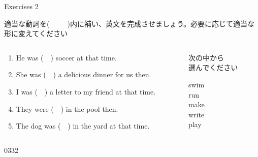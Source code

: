 \documentclass[aspectratio=169,xcolor={dvipsnames,table}]{beamer}
\begin{document}
\begin{frame}[plain]{Exercises 2}

{\small 適当な動詞を(~~~~~)内に補い、英文を完成させましょう。必要に応じて適当な形に変えてください}

\begin{columns}[t]
\begin{column}{.75\textwidth}
 \begin{enumerate}
  \item He was (~~) soccer at that time.
  \item She was  (~~) a delicious dinner for us then.
  \item I was  (~~) a letter to my friend at that time.
  \item They were  (~~) in the pool then.
  \item The dog was  (~~) in the yard at that time. \\
\hfill{}\hfill\mbox{}
 \end{enumerate} 
\end{column} 
\begin{column}{.225\textwidth}
{\small 次の中から\\選んでください}
 \begin{tcolorbox}
  swim\\
  run\\
  make\\
  write\\
  play
 \end{tcolorbox}
\end{column}
\end{columns}


\hfill{\tiny 0332}\,{\scriptsize {}}

\end{frame}

\end{document}
